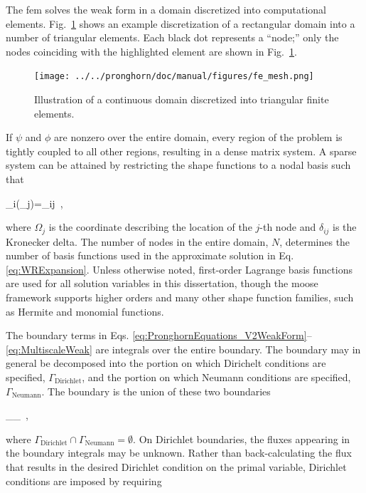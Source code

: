 The \gls{fem} solves the weak form in a domain discretized into computational elements. Fig.\ \ref{fig:fe_mesh} shows an example discretization of a rectangular domain into a number of triangular elements. Each black dot represents a ``node;'' only the nodes coinciding with the highlighted element are shown in Fig.\ \ref{fig:fe_mesh}.

\begin{figure}[!h]
\centering
\texttt{[image: ../../pronghorn/doc/manual/figures/fe\_mesh.png]}
\caption{Illustration of a continuous domain discretized into triangular finite elements.}
\label{fig:fe_mesh}
\end{figure}

If \(\psi\) and \(\phi\) are nonzero over the entire domain, every region of the problem is tightly coupled to all other regions, resulting in a dense matrix system. A sparse system can be attained by restricting the shape functions to a nodal basis such that

\beq
\label{eq:Nodal}
\phi_i(\Omega_j)=\delta_{ij}\ ,
\eeq

\noindent where \(\Omega_j\) is the coordinate describing the location of the \(j\)-th node and \(\delta_{ij}\) is the Kronecker delta. The number of nodes in the entire domain, \(N\), determines the number of basis functions used in the approximate solution in Eq. \eqref{eq:WRExpansion}. Unless otherwise noted, first-order Lagrange basis functions are used for all solution variables in this dissertation, though the \gls{moose} framework supports higher orders and many other shape function families, such as Hermite and monomial functions.

The boundary terms in Eqs. \eqref{eq:PronghornEquations_V2WeakForm}--\eqref{eq:MultiscaleWeak} are integrals over the entire boundary. The boundary may in general be decomposed into the portion on which Dirichelt conditions are specified, \(\Gamma_\text{Dirichlet}\), and the portion on which Neumann conditions are specified, \(\Gamma_\text{Neumann}\). The boundary is the union of these two boundaries

\beq
\Gamma\equiv\Gamma_\cup\Gamma_\ ,
\eeq

\noindent where \(\Gamma_\text{Dirichlet}\cap\Gamma_\text{Neumann}=\emptyset\). On Dirichlet boundaries, the fluxes appearing in the boundary integrals may be unknown. Rather than back-calculating the flux that results in the desired Dirichlet condition on the primal variable, Dirichlet conditions are imposed by requiring

